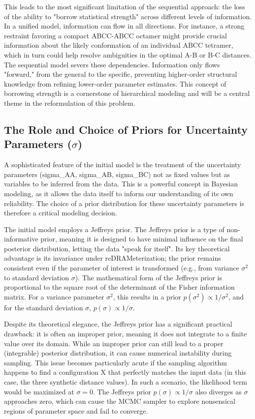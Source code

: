 \documentclass{article}
\begin{document}
This leads to the most significant limitation of the sequential approach: the loss of the ability to "borrow statistical strength" across different levels of information. In a unified model, information can flow in all directions. For instance, a strong restraint favoring a compact ABCC-ABCC octamer might provide crucial information about the likely conformation of an individual ABCC tetramer, which in turn could help resolve ambiguities in the optimal A-B or B-C distances. The sequential model severs these dependencies. Information only flows "forward," from the general to the specific, preventing higher-order structural knowledge from refining lower-order parameter estimates. This concept of borrowing strength is a cornerstone of hierarchical modeling and will be a central theme in the reformulation of this problem.\cite{ref7}

\subsection{The Role and Choice of Priors for Uncertainty Parameters ($\sigma$)}

A sophisticated feature of the initial model is the treatment of the uncertainty parameters (sigma\_AA, sigma\_AB, sigma\_BC) not as fixed values but as variables to be inferred from the data. This is a powerful concept in Bayesian modeling, as it allows the data itself to inform our understanding of its own reliability.\cite{ref10} The choice of a prior distribution for these uncertainty parameters is therefore a critical modeling decision.

The initial model employs a Jeffreys prior. The Jeffreys prior is a type of non-informative prior, meaning it is designed to have minimal influence on the final posterior distribution, letting the data "speak for itself".\cite{ref11} Its key theoretical advantage is its invariance under reDRAMeterization; the prior remains consistent even if the parameter of interest is transformed (e.g., from variance $\sigma^2$ to standard deviation $\sigma$).\cite{ref11} The mathematical form of the Jeffreys prior is proportional to the square root of the determinant of the Fisher information matrix. For a variance parameter $\sigma^2$, this results in a prior $p(\sigma^2) \propto 1/\sigma^2$, and for the standard deviation $\sigma$, $p(\sigma) \propto 1/\sigma$.\cite{ref10}

Despite its theoretical elegance, the Jeffreys prior has a significant practical drawback: it is often an improper prior, meaning it does not integrate to a finite value over its domain.\cite{ref11} While an improper prior can still lead to a proper (integrable) posterior distribution, it can cause numerical instability during sampling. This issue becomes particularly acute if the sampling algorithm happens to find a configuration X that perfectly matches the input data (in this case, the three synthetic distance values). In such a scenario, the likelihood term would be maximized at $\sigma = 0$. The Jeffreys prior $p(\sigma) \propto 1/\sigma$ also diverges as $\sigma$ approaches zero, which can cause the MCMC sampler to explore nonsensical regions of parameter space and fail to converge.\cite{ref10}
\end{document}
